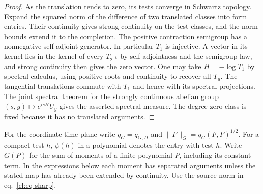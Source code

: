 \documentclass[11pt,letterpaper,reqno]{amsart}
\numberwithin{equation}{section}
\renewcommand{\eqref}[1]{\textup{eq.~\ref{#1}}}
\theoremstyle{definition}
\theoremstyle{remark}
\begin{document}
\begin{proof}
As the translation tends to zero, its tests converge in
Schwartz topology. Expand the squared norm of the difference
of two translated classes into form entries. Their continuity
gives strong continuity on the test classes, and the norm
bounds extend it to the completion. The positive contraction
semigroup has a nonnegative self-adjoint generator. In
particular \(T_1\) is injective. A vector in its kernel lies
in the kernel of every \(T_{2^{-k}}\) by self-adjointness
and the semigroup law, and strong continuity then gives
the zero vector. One may take \(H=-\log T_1\) by spectral
calculus, using positive roots and continuity to recover all
\(T_u\). The tangential translations commute with \(T_1\)
and hence with its spectral projections. The joint spectral
theorem for the strongly continuous abelian group
\((s,y)\mapsto e^{isH}U_y\) gives the asserted spectral
measure. The degree-zero class is fixed because it has no
translated arguments.
\end{proof}

For the coordinate time plane write \(q_G=q_{G,\Pi}\) and
\(\|F\|_G=q_G(F,F)^{1/2}\). For a compact test \(h\),
\(\phi(h)\) in a polynomial denotes the entry with test \(h\).
Write \(G(P)\) for the sum of moments of a finite polynomial
\(P\), including its constant term. In the expressions below
each moment has separated arguments unless the stated map
has already been extended by continuity. Use the source norm
in \eqref{cl:eq-sharp}.
\end{document}
